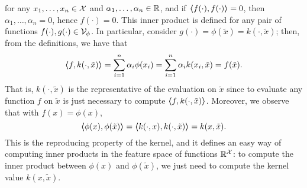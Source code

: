 for any $x_1, \ldots, x_n \in \mathcal{X}$ and $\alpha_1, \ldots, \alpha_n \in \mathbb{R}$, and if $\bm{\left\langle} f(\cdot), f(\cdot) \bm{\right\rangle} = 0$, then $\alpha_1, \ldots, \alpha_n =0$, hence $f(\cdot) = 0$.
%
This inner product is defined for any pair of functions $f(\cdot), g(\cdot) \in \mathcal{V}_\phi$. In particular, consider $g(\cdot) = \phi(\tilde{x}) = k(\cdot, \tilde{x})$; then, from the definitions, we have that
$$ \bm{\left\langle} f, k(\cdot, \tilde{x}) \bm{\right\rangle} = \sum_{i=1}^n \alpha_i \phi(x_i) =\sum_{i=1}^n \alpha_i k(x_i, \tilde{x}) = f(\tilde{x}) .$$
That is, $k(\cdot, \tilde{x})$ is the representative of the evaluation on $\tilde{x}$ since to evaluate any function $f$ on $\tilde{x}$ is just necessary to compute $\bm{\left\langle} f, k(\cdot, \tilde{x}) \bm{\right\rangle}$. Moreover, we observe that with $f(x) = \phi(x)$,
$$ \bm{\left\langle} \phi(x), \phi(\tilde{x}) \bm{\right\rangle} = \bm{\left\langle} k(\cdot, x), k(\cdot, \tilde{x}) \bm{\right\rangle} = k(x, \tilde{x}) .$$  
This is the reproducing property of the kernel, and it defines an easy way of computing inner products in the feature space of functions $\mathbb{R}^{\mathcal{X}}$: to compute the inner product between $\phi(x)$ and $\phi(\tilde{x})$, we just need to compute the kernel value $k(x, \tilde{x})$.

